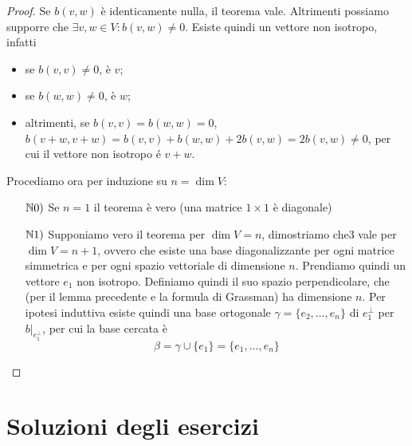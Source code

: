 \documentclass{article}     %
\begin{document}
\begin{proof}
    Se $b(v,w)$ è identicamente nulla, il teorema vale. Altrimenti possiamo supporre che $\exists v,w\in V: b(v,w)\neq 0$. Esiste quindi un vettore non isotropo, infatti 
    \begin{itemize}
        \item se $b(v,v)\neq 0$, è $v$;
        \item se $b(w,w)\neq 0$, è $w$;
        \item altrimenti, se $b(v,v)=b(w,w)=0$, $b(v+w,v+w)=b(v,v)+b(w,w)+2b(v,w)=2b(v,w)\neq 0$, per cui il vettore non isotropo é $v+w$.
    \end{itemize}
Procediamo ora per induzione su $n=\dim V$:
\begin{itemize}
    \item[$\mathbb{N}0)$] Se $n=1$ il teorema è vero (una matrice $1\times 1$ è diagonale)
    \item[$\mathbb{N}1)$] Supponiamo vero il teorema per $\dim V=n$, dimostriamo che3 vale per $\dim V = n+1$, ovvero che esiste una base diagonalizzante per ogni matrice simmetrica e per ogni spazio vettoriale di dimensione $n$. Prendiamo quindi un vettore $e_1$ non isotropo. Definiamo quindi il suo spazio perpendicolare, che (per il lemma precedente e la formula di Grassman) ha dimensione $n$. Per ipotesi induttiva esiste quindi una base ortogonale $\gamma=\{e_2, \dots, e_n\}$ di $e_1^\perp$ per $b|_{e_1^\perp}$, per cui la base cercata è \[\beta=\gamma \cup \{e_1\}=  \{e_1, \dots, e_n\}\]
\end{itemize}
\end{proof}


\newpage
\section{Soluzioni degli esercizi}
\end{document}

